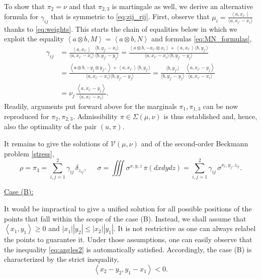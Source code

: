 \documentclass[11pt,letterpaper,reqno]{amsart}
\theoremstyle{definition}
\numberwithin{equation}{section}
\newcommand{\pairing}[1]{{\left \langle #1 \right \rangle}}
\newcommand{\abs}[1]{{\left \lvert #1 \right \rvert}}
\begin{document}
{To show that $\pi_2 = \nu$ and that $\pi_{2,3}$ is martingale as well, we derive an alternative formula for $\gamma_{ij}$ that is symmetric to \eqref{eq:zij_rij}. First, observe that $\mu_i = \frac{\pairing{a,x_{i'}}}{\langle a, x_{i'} -x_i \rangle}$ thanks to \eqref{eq:weights}. This starts the chain of equalities below in which we exploit the equality
$\pairing{a \otimes b,M} = \pairing{a\otimes b,N}$ and formulas \eqref{eq:MN_formulas},
\begin{align*}
	\gamma_{ij} &= \frac{\pairing{a,x_{i'}}}{\langle a, x_{i'} -x_i \rangle} \frac{\langle b,y_{j'} -x_i\rangle }{\langle b, y_{j'}-y_j \rangle} =\frac{ \pairing{ a \otimes b, -x_{i'} \otimes x_i} +\pairing{a,x_{i'}} \langle b,y_{j'} \rangle }{\langle a, x_{i'} -x_i \rangle \langle b, y_{j'}-y_j \rangle}  \\
	&=\frac{ \pairing{a \otimes b,-y_{j} \otimes y_{j'},} +\pairing{a,x_{i'}} \langle b,y_{j'} \rangle }{\langle a, x_{i'} -x_i \rangle \langle b, y_{j'}-y_j \rangle} = \frac{ \langle b,y_{j'}\rangle }{ \langle b, y_{j'}-y_j \rangle} \frac{\pairing{a,x_{i'}-y_j}}{\langle a, x_{i'} -x_i \rangle } \\
	&= \nu_j\, \frac{\pairing{a,x_{i'}-y_j}}{\langle a, x_{i'} -x_i \rangle }.
\end{align*}
Readily, arguments put forward above for the marginals $\pi_1, \pi_{1,3}$ can be now reproduced for $\pi_2, \pi_{2,3}$. Admissibility $\pi \in \Sigma(\mu,\nu)$ is thus established and, hence, also the optimality of the pair $(u,\pi)$.

It remains to give the solutions of $\mathcal{V}(\mu,\nu)$ and of the second-order Beckmann problem \eqref{stress},
\begin{equation*}
	\rho = \pi_3  = \sum_{i,j=1}^2 \gamma_{ij} \, \delta_{z_{ij}}, \quad \ \ 	\sigma = \iiint \sigma^{x,y,z}\,\pi(dxdydz) = \sum_{i,j=1}^2 \gamma_{ij} \, \sigma^{x_i,y_j,z_{ij}}.
\end{equation*}


\noindent \underline{Case (B):}

It would be impractical to give a unified solution for all possible positions of the points that fall within the scope of the case (B). Instead, we shall assume that
$\pairing{x_1,y_1} \geq 0$ and $ \abs{x_1}\abs{y_2} \leq \abs{x_2} \abs{y_1}$. It is not restrictive as one can always relabel the points to guarantee it. Under those assumptions, one can easily observe that the inequality \eqref{eq:angles2} is automatically satisfied. Accordingly, the case (B) is characterized by the strict inequality,
\begin{equation}
	\label{eq:ineq_viol}
	\pairing{x_2-y_2,y_1-x_1} < 0.
\end{equation}

}
\end{document}
